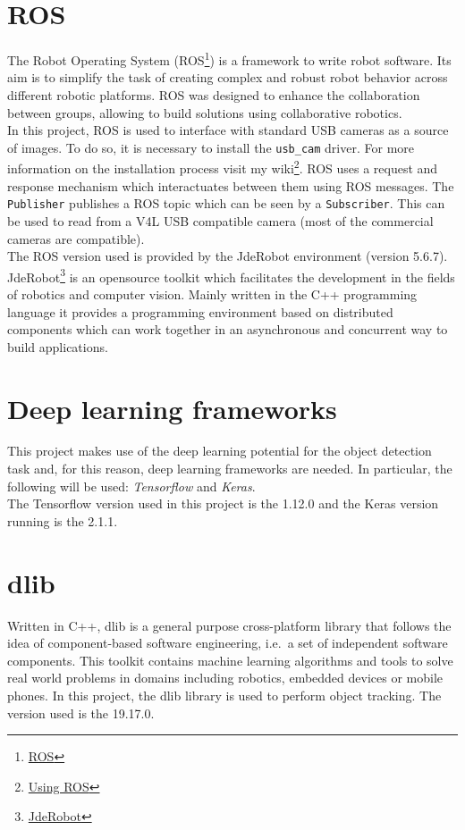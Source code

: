 \section{ROS}
The Robot Operating System (ROS\footnote {\href{https://www.ros.org/}{ROS}}) is a framework to write robot software. Its aim is to simplify the task of creating complex and robust robot behavior across different robotic platforms. ROS was designed to enhance the collaboration between groups, allowing to build solutions using collaborative robotics.\\
In this project, ROS is used to interface with standard USB cameras as a source of images. To do so, it is necessary to install the \texttt{usb\_cam} driver. For more information on the installation process visit my wiki\footnote {\label{using_ros}\href{https://jderobot.org/Arodriguez-tfm\#Week_24:_Introducing_ROS}{Using ROS}}. ROS uses a request and response mechanism which interactuates between them using ROS messages. The \texttt{Publisher} publishes a ROS topic which can be seen by a \texttt{Subscriber}. This can be used to read from a V4L USB compatible camera (most of the commercial cameras are compatible).\\
The ROS version used is provided by the JdeRobot environment (version 5.6.7).\\
JdeRobot\footnote {\href{https://jderobot.org/Main_Page}{JdeRobot}} is an opensource toolkit which facilitates the development in the fields of robotics and computer vision. Mainly written in the C++ programming language it provides a programming environment based on distributed components which can work together in an asynchronous and concurrent way to build applications.

\section{Deep learning frameworks}
This project makes use of the deep learning potential for the object detection task and, for this reason, deep learning frameworks are needed. In particular, the following will be used: \textit{Tensorflow} and \textit{Keras}.\\
The Tensorflow version used in this project is the 1.12.0 and the Keras version running is the 2.1.1.

\section{dlib}
Written in C++, dlib is a general purpose cross-platform library that follows the idea of component-based software engineering, i.e.\ a set of independent software components. This toolkit contains machine learning algorithms and tools to solve real world problems in domains including robotics, embedded devices or mobile phones. In this project, the dlib library is used to perform object tracking. The version used is the 19.17.0.

